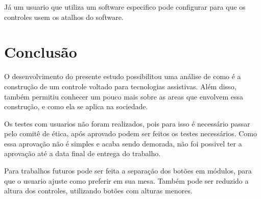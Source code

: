 \documentclass[
	12pt,			%
	openright,		%
	oneside,			%
	a4paper,			%
	chapter=TITLE,		%
	english,			%
	brazil,			%
	]{abntex2}
\begin{document}
Já um usuario que utiliza um software especifico pode configurar para que os controles usem os atalhos do software.

\chapter{Conclusão}

O desenvolvimento do presente estudo possibilitou uma análise de como é a construção de um controle voltado para tecnologias assistivas. Além disso, também permitiu conhecer um pouco mais sobre as areas que envolvem essa construção, e como ela se aplica na sociedade.

Os testes com usuarios não foram realizados, pois para isso é necessário passar pelo comitê de ética, após aprovado podem ser feitos os testes necessários. Como essa aprovação não é simples e acaba sendo demorada, não foi possivel ter a aprovação até a data final de entrega do trabalho.

Para trabalhos futuros pode ser feita a separação dos botões em módulos, para que o usuario ajuste como preferir em sua mesa. Também pode ser reduzido a altura dos controles, utilizando botões com alturas menores.

\nocite{unojoy}
\nocite{uniriotec}
\nocite{governobr}
\nocite{ifprcuritiba}
\nocite{joytokey}
\nocite{antimicro}
\nocite{arduinothomsen}
\nocite{arduinocomprarthomsen}
\nocite{xpadder}
\nocite{ifba}
\nocite{civiam}
\nocite{civiamRoller}
\nocite{tix}
\nocite{iso9241}
\nocite{sdhpr}
\nocite{saude}
\nocite{w3c}
\nocite{lei10098}
\nocite{anexoa}


%






\postextual


%





%
%
\end{document}
